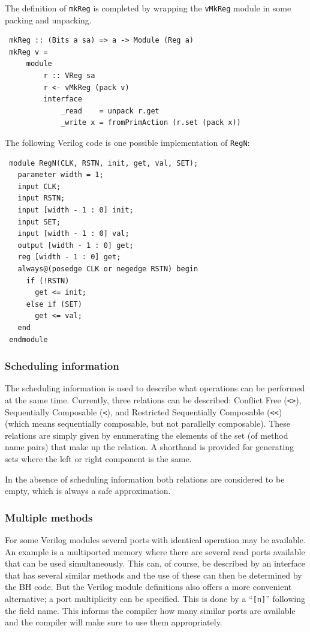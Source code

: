 \documentclass[twoside,letterpaper]{article}
\newcommand{\BH}{BH}
\newcommand{\veri}{Verilog}
\newcommand{\te}[1]{\texttt{#1}}
\newcommand{\qbs}[1]{``\mbox{\te{#1}}''}
\begin{document}
The definition of \te{mkReg} is completed by wrapping the \te{vMkReg}
module in some packing and unpacking.
\begin{verbatim}
 mkReg :: (Bits a sa) => a -> Module (Reg a)
 mkReg v =
     module
         r :: VReg sa
         r <- vMkReg (pack v)
         interface
             _read    = unpack r.get
             _write x = fromPrimAction (r.set (pack x))
\end{verbatim}

The following {\veri} code is one possible implementation of \te{RegN}:
\begin{verbatim}
 module RegN(CLK, RSTN, init, get, val, SET);
   parameter width = 1;
   input CLK;
   input RSTN;
   input [width - 1 : 0] init;
   input SET;
   input [width - 1 : 0] val;
   output [width - 1 : 0] get;
   reg [width - 1 : 0] get;
   always@(posedge CLK or negedge RSTN) begin
     if (!RSTN)
       get <= init;
     else if (SET)
       get <= val;
   end
 endmodule
\end{verbatim}

\subsubsection{Scheduling information}
The scheduling information is used to describe what operations can
be performed at the same time.  Currently, three relations can be described:
Conflict Free (\te{<>}), Sequentially Composable (\te{<}), and
Restricted Sequentially Composable (\verb'<<') (which means sequentially
composable, but not parallelly composable).
These relations are simply given by enumerating the elements of the
set (of method name pairs) that make up the relation.
A shorthand is provided for generating sets where the left or right
component is the same.

In the absence of scheduling information both relations are considered to be empty,
which is always a safe approximation.


\subsubsection{Multiple methods}

\label{sec-multiple}

For some {\veri} modules several ports with identical operation may
be available.  An example is a multiported memory where there are
several read ports available that can be used simultaneously.
This can, of course, be described by an interface that has several
similar methods and the use of these can then be determined by the
{\BH} code.  But the {\veri} module definitions also offers a
more convenient alternative; a port multiplicity can be specified.
This is done by a \qbs{[n]} following the field name.  This informs
the compiler how many similar ports are available and the compiler
will make sure to use them appropriately.
\end{document}
